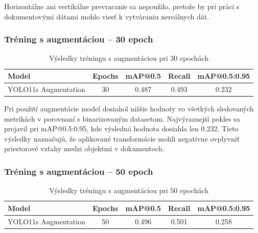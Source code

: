             Horizontálne ani vertikálne prevracanie sa nepoužilo, pretože by pri práci s dokumentovými dátami mohlo viesť k vytváraniu nereálnych dát.

            \subsubsection{Tréning s augmentáciou – 30 epoch}

            \begin{table}[H]
                \centering
                \begin{tabular}{|l|c|c|c|c|}
                \hline
                \textbf{Model} & \textbf{Epochs} & \textbf{mAP@0.5} & \textbf{Recall} & \textbf{mAP@0.5:0.95} \\ \hline
                YOLO11s Augmentation & 30 & 0.487 & 0.493 & 0.232 \\ \hline
                \end{tabular}
                \caption{Výsledky tréningu s augmentáciou pri 30 epochách}
                \label{tab:aug30}
            \end{table}

            Pri použití augmentácie model dosiahol nižšie hodnoty vo všetkých sledovaných metrikách v porovnaní s binarizovaným datasetom. Najvýraznejší pokles sa prejavil pri mAP@0.5:0.95, kde výsledná hodnota dosiahla len 0.232. Tieto výsledky naznačujú, že aplikované transformácie mohli negatívne ovplyvniť priestorové vzťahy medzi objektmi v dokumentoch.

            \subsubsection{Tréning s augmentáciou – 50 epoch}

            \begin{table}[H]
                \centering
                \begin{tabular}{|l|c|c|c|c|}
                \hline
                \textbf{Model} & \textbf{Epochs} & \textbf{mAP@0.5} & \textbf{Recall} & \textbf{mAP@0.5:0.95} \\ \hline
                YOLO11s Augmentation & 50 & 0.496 & 0.501 & 0.258 \\ \hline
                \end{tabular}
                \caption{Výsledky tréningu s augmentáciou pri 50 epochách}
                \label{tab:aug50}
            \end{table}


